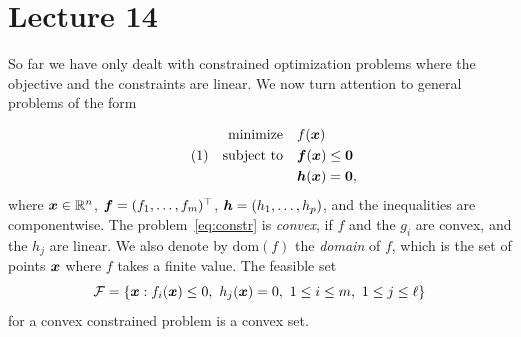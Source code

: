 %
%
% 


\chapter*{Lecture 14}
\addtocounter{chapter}{14}


So far we have only dealt with constrained optimization problems where the objective and the constraints are linear. We now turn attention to general problems of the form

\begin{align*}\label{eq:constr}\tag{1}
\begin{split}
 \text{minimize}\quad & f(\bm{x})\\
 \quad\text{subject to}\quad & \bm{f}(\bm{x})\leq \bm{0}\\
         & \bm{h}(\bm{x})= \bm{0},
\end{split}
\end{align*}
where $\bm{x}\in \mathbb{R}^n$, $\bm{f}=(f_1,\dots,f_m)^{\top}$, $\bm{h}=(h_1,\dots,h_{p})$, and the inequalities are componentwise. 
The problem~\eqref{eq:constr} is {\em convex}, if $f$ and the $g_i$ are convex, and the $h_j$ are linear. We also denote by $\mathrm{dom}(f)$ the {\em domain} of $f$, which is the set of points $\bm{x}$ where $f$ takes a finite value. The feasible set
\begin{equation*}
 \mathcal{F} = \{\bm{x} \mathrel{\mathop{:}} f_i(\bm{x})\leq 0, \ h_j(\bm{x})=0, \ 1\leq i\leq m, \ 1\leq j\leq \ell\}
\end{equation*}
for a convex constrained problem is a convex set.

